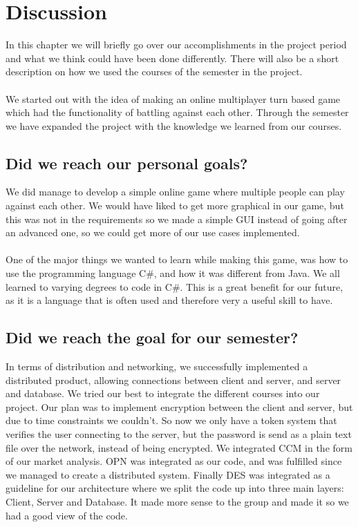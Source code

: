 \section{Discussion}
	In this chapter we will briefly go over our accomplishments in the project
   period and what we think could have been done differently. There will also
    be a short description on how we used the courses of the semester in the
     project.
	\\
	\\
	We started out with the idea of making an online multiplayer turn based
   game which had the functionality of battling against each other. Through
    the semester we have expanded the project with the knowledge we learned
     from our courses.
	\\
	\subsection{Did we reach our personal goals?}
	We did manage to develop a simple online game where multiple people can play
   against each other. We would have liked to get more graphical in our game,
    but this was not in the requirements so we made a simple GUI instead of
    going after an advanced one, so we could get more of our use cases
     implemented.
	\\
	\\
One of the major things we wanted to learn while making this game, was how
 to use the programming language C\#, and how it was different from Java.
 We all learned to varying degrees to code in C\#. This is a great benefit
 for our future, as it is a language that is often used and therefore very
 a useful skill to have.
	\\
	\subsection{Did we reach the goal for our semester?}
	In terms of distribution and networking, we successfully implemented a
  distributed product, allowing connections between client and server, and
   server and database.
We tried our best to integrate the different courses into our project. Our
 plan was to implement encryption between the client and server, but due to
  time constraints we couldn’t. So now we only have a token system that
   verifies the user connecting to the server, but the password is send as
    a plain text file over the network, instead of being encrypted. We
    integrated CCM in the form of our market analysis. OPN was integrated
     as our code, and was fulfilled since we managed to create a distributed
     system. Finally DES was integrated as a guideline for our architecture
     where we split the code up into three main layers: Client, Server and
     Database. It made more sense to the group and made it so we had a good
      view of the code.
	\\
